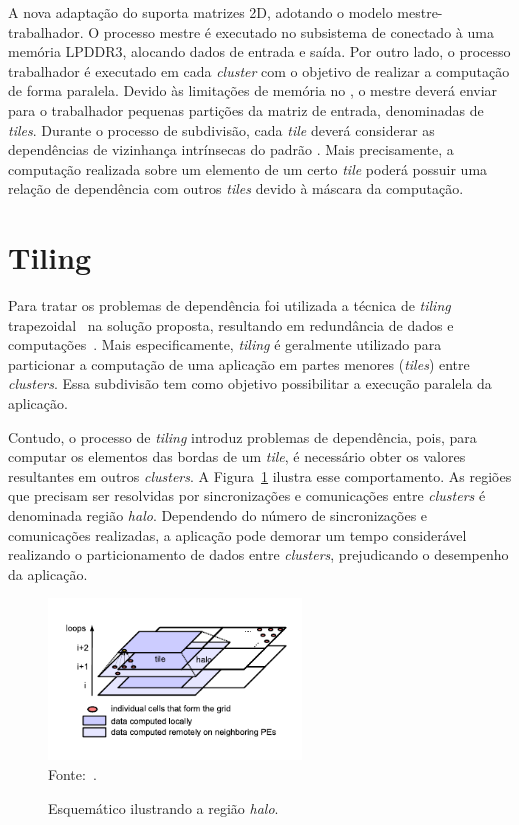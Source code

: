 A nova adaptação do \fw suporta matrizes \stencil 2D, adotando o modelo
mestre-trabalhador. O processo mestre é executado no subsistema de \es conectado
à uma memória LPDDR3, alocando dados de entrada e saída. Por outro lado, o
processo trabalhador é executado em cada \textit{cluster} com o
objetivo de realizar a computação \stencil de forma paralela. Devido às
limitações de memória no \mppa, o mestre deverá enviar para o trabalhador
pequenas partições da matriz de entrada, denominadas de \textit{tiles}. Durante
o processo de subdivisão, cada \textit{tile} deverá considerar as dependências
de vizinhança intrínsecas do padrão \stencil. Mais precisamente, a computação
realizada sobre um elemento de um certo \textit{tile} poderá possuir uma relação
de dependência com outros \textit{tiles} devido à máscara da computação.


\section{Tiling}

Para tratar os problemas de dependência foi utilizada a técnica de
\textit{tiling} trapezoidal~\cite{meng11} na solução proposta, resultando em redundância de
dados e computações~\cite{rocha17}. Mais especificamente, \textit{tiling} é
geralmente utilizado para particionar a computação de uma aplicação \stencil em
partes menores (\textit{tiles}) entre \textit{clusters}. Essa subdivisão
tem como objetivo possibilitar a execução paralela da aplicação.

Contudo, o processo de \textit{tiling} introduz problemas de dependência, pois,
para computar os elementos das bordas de um \textit{tile}, é necessário obter
os valores resultantes em outros \textit{clusters}. A Figura~\ref{fig:tilingHalo} ilustra
esse comportamento. As regiões que precisam ser resolvidas por sincronizações e
comunicações entre \textit{clusters} é denominada região \textit{halo}. Dependendo do número
de sincronizações e comunicações realizadas, a aplicação pode demorar um tempo
considerável realizando o particionamento de dados entre \textit{clusters}, prejudicando o
desempenho da aplicação.

\begin{figure}[!h]
	\centering
    \caption{Esquemático ilustrando a região \textit{halo}.}
    \includegraphics[width=0.6\textwidth]{figs/tilingHalo.pdf} \\
    Fonte:~\cite{meng11}.
    \label{fig:tilingHalo}
\end{figure}



